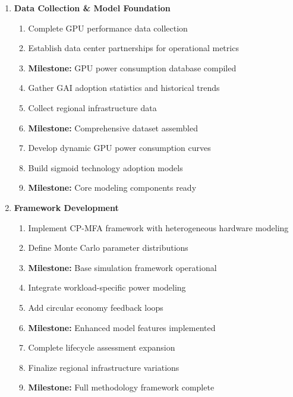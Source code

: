 \documentclass[a4paper, 12pt]{article}
\begin{document}
\begin{enumerate}
    \item \textbf{Data Collection \& Model Foundation}
    \begin{enumerate}
        \item Complete GPU performance data collection
        \item Establish data center partnerships for operational metrics
        \item \textbf{Milestone:} GPU power consumption database compiled
        \item Gather GAI adoption statistics and historical trends
        \item Collect regional infrastructure data
        \item \textbf{Milestone:} Comprehensive dataset assembled
        \item Develop dynamic GPU power consumption curves
        \item Build sigmoid technology adoption models
        \item \textbf{Milestone:} Core modeling components ready
    \end{enumerate}
    
    \item \textbf{Framework Development}
    \begin{enumerate}
        \item Implement CP-MFA framework with heterogeneous hardware modeling
        \item Define Monte Carlo parameter distributions
        \item \textbf{Milestone:} Base simulation framework operational
        \item Integrate workload-specific power modeling
        \item Add circular economy feedback loops
        \item \textbf{Milestone:} Enhanced model features implemented
        \item Complete lifecycle assessment expansion
        \item Finalize regional infrastructure variations
        \item \textbf{Milestone:} Full methodology framework complete
    \end{enumerate}
    

\end{enumerate}
\end{document}

